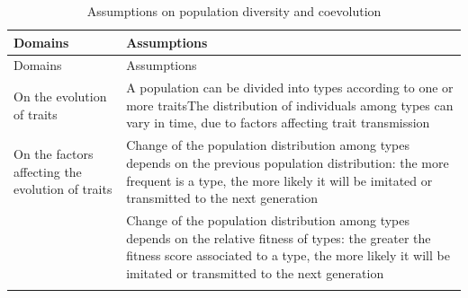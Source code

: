 \documentclass[
]{book}
\begin{document}
\begin{longtable}[]{@{}ll@{}}
\caption{Assumptions on population diversity and coevolution}\tabularnewline
\toprule
\begin{minipage}[b]{0.45\columnwidth}\raggedright
Domains\strut
\end{minipage} & \begin{minipage}[b]{0.49\columnwidth}\raggedright
Assumptions\strut
\end{minipage}\tabularnewline
\midrule
\endfirsthead
\toprule
\begin{minipage}[b]{0.45\columnwidth}\raggedright
Domains\strut
\end{minipage} & \begin{minipage}[b]{0.49\columnwidth}\raggedright
Assumptions\strut
\end{minipage}\tabularnewline
\midrule
\endhead
\begin{minipage}[t]{0.45\columnwidth}\raggedright
On the evolution of traits\strut
\end{minipage} & \begin{minipage}[t]{0.49\columnwidth}\raggedright
A population can be divided into types according to one or more traitsThe distribution of individuals among types can vary in time, due to factors affecting trait transmission\strut
\end{minipage}\tabularnewline
\begin{minipage}[t]{0.45\columnwidth}\raggedright
On the factors affecting the evolution of traits\strut
\end{minipage} & \begin{minipage}[t]{0.49\columnwidth}\raggedright
Change of the population distribution among types depends on the previous population distribution: the more frequent is a type, the more likely it will be imitated or transmitted to the next generation\strut
\end{minipage}\tabularnewline
\begin{minipage}[t]{0.45\columnwidth}\raggedright
﻿\strut
\end{minipage} & \begin{minipage}[t]{0.49\columnwidth}\raggedright
Change of the population distribution among types depends on the relative fitness of types: the greater the fitness score associated to a type, the more likely it will be imitated or transmitted to the next generation\strut
\end{minipage}\tabularnewline
\begin{minipage}[t]{0.45\columnwidth}\raggedright

\end{minipage}
\end{longtable}
\end{document}
